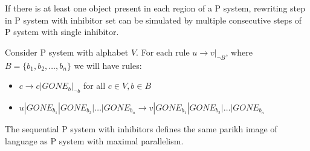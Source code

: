 \documentclass[a4paper,10pt]{article}
\begin{document}
\begin{lema}
\label{lemma:inhibitor_step}
  If there is at least one object present in each region of a P system, rewriting step in P system with inhibitor set can be simulated by multiple consecutive steps of P system with single inhibitor.
\end{lema}

\begin{dokaz}
  Consider P system with alphabet $V$.
  For each rule $u\rightarrow v|_{\neg B}$, where $B=\{b_1, b_2, \dots ,b_n\}$ we will have rules:
  \begin{itemize}
    \item $c \rightarrow c|GONE_{b}|_{\neg b}$ for all $ c\in V, b\in B$
    \item $u|GONE_{b_1}|GONE_{b_2}|\dots|GONE_{b_n} \rightarrow v|GONE_{b_1}|GONE_{b_2}|\dots|GONE_{b_n}$
  \end{itemize}
\end{dokaz}



\begin{veta}
  The sequential P system with inhibitors defines the same parikh image of language as P system with maximal parallelism.
\end{veta}
\end{document}
